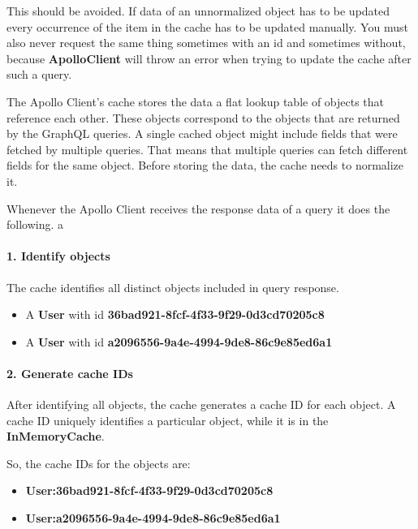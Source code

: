 This should be avoided. If data of an unnormalized object has to be updated every occurrence of the item in the cache has to be updated manually. You must also never request the same thing sometimes with an id and sometimes without, because \textbf{ApolloClient} will throw an error when trying to update the cache after such a query.

The Apollo Client's cache stores the data a flat lookup table of objects that reference each other. These objects correspond to the objects that are returned by the GraphQL queries. A single cached object might include fields that were fetched by multiple queries. That means that multiple queries can fetch different fields for the same object. Before storing the data, the cache needs to normalize it. \cite{misc:-:apollo-client-cache-overview}

Whenever the Apollo Client receives the response data of a query it does the following. a

\paragraph{1. Identify objects} 

The cache identifies all distinct objects included in query response.

\begin{itemize}
  \item A \textbf{User} with id \textbf{36bad921-8fcf-4f33-9f29-0d3cd70205c8}
  \item A \textbf{User} with id \textbf{a2096556-9a4e-4994-9de8-86c9e85ed6a1}
\end{itemize}

\paragraph{2. Generate cache IDs} 

After identifying all objects, the cache generates a cache ID for each object. A cache ID uniquely identifies a particular object, while it is in the \textbf{InMemoryCache}.

So, the cache IDs for the objects are: 

\begin{itemize}
  \item \textbf{User:36bad921-8fcf-4f33-9f29-0d3cd70205c8}
  \item \textbf{User:a2096556-9a4e-4994-9de8-86c9e85ed6a1}
\end{itemize}


